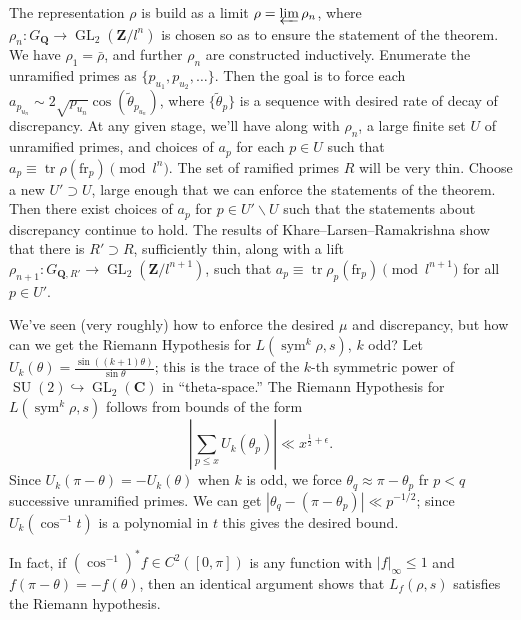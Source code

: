 \documentclass{article}
\DeclareMathOperator{\GL}{GL}
\DeclareMathOperator{\SU}{SU}
\DeclareMathOperator{\sym}{sym}
\DeclareMathOperator{\tr}{tr}
\newcommand{\bC}{\mathbf{C}}
\newcommand{\bQ}{\mathbf{Q}}
\newcommand{\bZ}{\mathbf{Z}}
\newcommand{\frob}{\mathrm{fr}}
\begin{document}
The representation $\rho$ is build as a limit $\rho = \varprojlim \rho_n$, 
where $\rho_n\colon G_\bQ \to \GL_2(\bZ/l^n)$ is chosen so as to ensure the 
statement of the theorem. We have $\rho_1 = \bar\rho$, and further $\rho_n$ 
are constructed inductively. Enumerate the unramified primes as 
$\{p_{u_1},p_{u_2},\dots\}$. Then the goal is to force each 
$a_{p_{u_n}} \sim 2\sqrt{p_{u_n}} \cos(\widetilde \theta_{p_{u_n}})$, where 
$\{\widetilde\theta_p\}$ is a sequence with desired rate of decay of 
discrepancy. At any given stage, we'll have along with $\rho_n$, a large finite 
set $U$ of unramified primes, and choices of $a_p$ for each $p\in U$ such that 
$a_p\equiv \tr\rho(\frob_p)\pmod{l^n}$. The set of ramified primes $R$ will be 
very thin. Choose a new $U'\supset U$, large enough that we can enforce the 
statements of the theorem. Then there exist choices of $a_p$ for 
$p\in U'\smallsetminus U$ such that the statements about discrepancy continue 
to hold. The results of Khare--Larsen--Ramakrishna show that there is 
$R'\supset R$, sufficiently thin, along with a lift 
$\rho_{n+1}\colon G_{\bQ,R'}\to \GL_2(\bZ/l^{n+1})$, such that 
$a_p\equiv\tr\rho_p(\frob_p)\pmod{l^{n+1}}$ for all $p\in U'$. 

We've seen (very roughly) how to enforce the desired $\mu$ and discrepancy, but 
how can we get the Riemann Hypothesis for $L(\sym^k \rho,s)$, $k$ odd? Let 
$U_k(\theta) = \frac{\sin((k+1)\theta)}{\sin\theta}$; this is the trace of the 
$k$-th symmetric power of $\SU(2)\hookrightarrow \GL_2(\bC)$ in 
``theta-space.'' The Riemann Hypothesis for $L(\sym^k \rho,s)$ follows from 
bounds of the form 
\[
	\left| \sum_{p\leqslant x} U_k(\theta_p)\right| \ll x^{\frac 1 2+\epsilon} .
\]
Since $U_k(\pi - \theta) = - U_k(\theta)$ when $k$ is odd, 
we force $\theta_q \approx \pi - \theta_p$ fr $p<q$ successive 
unramified primes. We can get 
$\left|\theta_q - (\pi - \theta_p)\right| \ll p^{-1/2}$; 
since $U_k(\cos^{-1} t)$ is a polynomial in $t$ this gives the desired bound. 

In fact, if $\left(\cos^{-1}\right)^\ast f\in C^2([0,\pi])$ is any function 
with $|f|_\infty\leqslant 1$ and $f(\pi-\theta) = -f(\theta)$, then an 
identical argument shows that $L_f(\rho,s)$ satisfies the Riemann hypothesis. 
\end{document}
